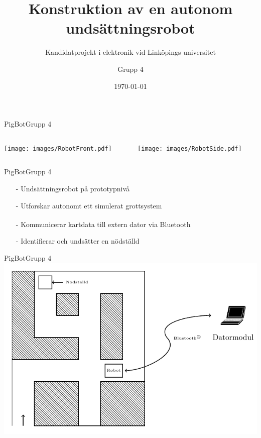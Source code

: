 \usepackage{extras}


\title{Konstruktion av en autonom undsättningsrobot}
\subtitle{Kandidatprojekt i elektronik vid Linköpings universitet}
\author{Grupp 4}
\beamertemplatenavigationsymbolsempty
\date{\today}



\begin{frame}
  \titlepage
\end{frame}


\begin{frame}{PigBot}{Grupp 4}
  \begin{columns}
    \begin{column}{0.5\textwidth}
      \texttt{[image: images/RobotFront.pdf]}
    \end{column}%
    \begin{column}{0.5\textwidth}
      \texttt{[image: images/RobotSide.pdf]}
    \end{column}
  \end{columns}
\end{frame}

\begin{frame}[fragile]{PigBot}{Grupp 4}
  \begin{itemize}
    \item[-] Undsättningsrobot på prototypnivå
\pause
    \item[-] Utforskar autonomt ett simulerat grottsystem
\pause
    \item[-] Kommunicerar kartdata till extern dator via Bluetooth\textsuperscript{\circledR}
\pause
    \item[-] Identifierar och undsätter en nödställd

  \end{itemize}
\end{frame}

\begin{frame}[fragile]{PigBot}{Grupp 4}
\centering
    \includegraphics[scale=0.7]{images/overview.pdf}


\end{frame}



